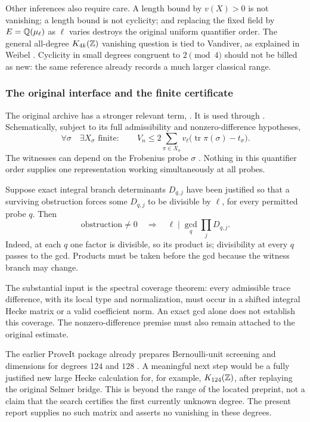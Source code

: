 Other inferences also require care. A length bound by \(v(X)>0\) is not
vanishing; a length bound is not cyclicity; and replacing the fixed field
by \(E=\mathbb Q(\mu_\ell)\) as \(\ell\) varies destroys the original uniform
quantifier order. The general all-degree \(K_{4k}(\mathbb Z)\) vanishing question
is tied to Vandiver, as explained in Weibel \cite{weibel}. Cyclicity in
small degrees congruent to \(2\pmod4\) should not be billed as new:
the same reference already records a much larger classical range.

\subsubsection*{The original interface and the finite certificate}

The original archive has a stronger relevant term,
.
It is used through .
Schematically, subject to its full admissibility and nonzero-difference
hypotheses,
\[
 \forall \sigma\quad\exists X_\sigma\text{ finite}:\qquad
 V_n\le2\sum_{\pi\in X_\sigma}
       v_\ell\bigl(\operatorname{tr}\pi(\sigma)-t_\sigma\bigr).
\]
The witnesses can depend on the Frobenius probe \(\sigma\)
\cite{original}. Nothing in this quantifier order supplies one
representation working simultaneously at all probes.

Suppose exact integral branch determinants \(D_{q,j}\) have been justified
so that a surviving obstruction forces some \(D_{q,j}\) to be divisible
by \(\ell\), for every permitted probe \(q\). Then
\[
 \text{obstruction}\ne0
 \quad\Longrightarrow\quad
 \ell\mid\gcd_q\prod_jD_{q,j}.
\]
Indeed, at each \(q\) one factor is divisible, so its product is;
divisibility at every \(q\) passes to the gcd. Products must be taken
before the gcd because the witness branch may change.

The substantial input is the spectral coverage theorem: every admissible
trace difference, with its local type and normalization, must occur in a
shifted integral Hecke matrix or a valid coefficient norm. An exact gcd
alone does not establish this coverage. The nonzero-difference premise
must also remain attached to the original estimate.

The earlier ProveIt package already prepares Bernoulli-unit screening
and dimensions for degrees \(124\) and \(128\)
\cite{priormean}. A meaningful next step would be a fully justified
new large Hecke calculation for, for example, \(K_{124}(\mathbb Z)\),
after replaying the original Selmer bridge. This is beyond the range
of the located preprint, not a claim that the search certifies the first
currently unknown degree. The present report supplies no such matrix
and asserts no vanishing in these degrees.

